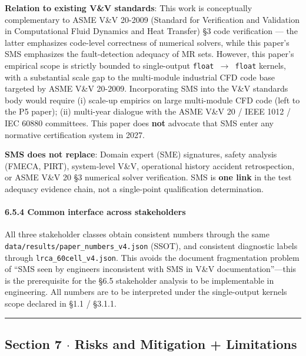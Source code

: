 \documentclass[review,12pt,authoryear]{elsarticle}
\begin{document}
\textbf{Relation to existing V\&V standards}: This work is conceptually
complementary to ASME V\&V 20-2009 (Standard for Verification and
Validation in Computational Fluid Dynamics and Heat Transfer) §3 code
verification --- the latter emphasizes code-level correctness of
numerical solvers, while this paper's SMS emphasizes the fault-detection
adequacy of MR sets. However, this paper's empirical scope is strictly
bounded to single-output \texttt{float\ $\to$\ float} kernels, with a
substantial scale gap to the multi-module industrial CFD code base
targeted by ASME V\&V 20-2009. Incorporating SMS into the V\&V standards
body would require (i) scale-up empirics on large multi-module CFD code
(left to the P5 paper); (ii) multi-year dialogue with the ASME V\&V 20 /
IEEE 1012 / IEC 60880 committees. This paper does \textbf{not} advocate
that SMS enter any normative certification system in 2027.

\textbf{SMS does not replace}: Domain expert (SME) signatures, safety
analysis (FMECA, PIRT), system-level V\&V, operational history accident
retrospection, or ASME V\&V 20 §3 numerical solver verification. SMS is
\textbf{one link} in the test adequacy evidence chain, not a
single-point qualification determination.

\paragraph{6.5.4 Common interface across
stakeholders}\label{common-interface-across-stakeholders}

All three stakeholder classes obtain consistent numbers through the same
\texttt{data/results/paper\_numbers\_v4.json} (SSOT), and consistent
diagnostic labels through \texttt{lrca\_60cell\_v4.json}. This avoids
the document fragmentation problem of ``SMS seen by engineers
inconsistent with SMS in V\&V documentation''---this is the prerequisite
for the §6.5 stakeholder analysis to be implementable in engineering.
All numbers are to be interpreted under the single-output kernels scope
declared in §1.1 / §3.1.1.

\begin{center}\rule{0.5\linewidth}{0.5pt}\end{center}

\subsection{Section 7 $\cdot$ Risks and Mitigation +
Limitations}\label{section-7-risks-and-mitigation-limitations}
\end{document}
